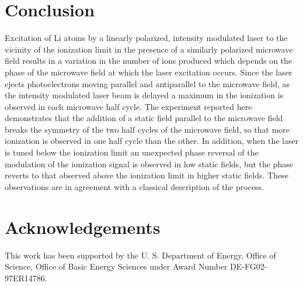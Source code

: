 \documentclass[aps,pra,preprint,groupedaddress]{revtex4-1}
\begin{document}
\section{\label{sec:conc} Conclusion}


Excitation of Li atoms by a linearly polarized, intensity modulated laser to the vicinity of the ionization limit in the presence of a similarly polarized microwave field results in a variation in the number of ions produced which depends on the phase of the microwave field at which the laser excitation occurs. Since the laser ejects photoelectrons moving parallel and antiparallel to the microwave field, as the intensity modulated laser beam is delayed a maximum in the ionization is observed in each microwave half cycle. The experiment reported here demonstrates that the addition of a static field parallel to the microwave field breaks the symmetry of the two half cycles of the microwave field, so that more ionization is observed in one half cycle than the other. In addition, when the laser is tuned below the ionization limit an unexpected phase reversal of the modulation of the ionization signal is observed in low static fields, but the phase reverts to that observed above the ionization limit in higher static fields. These observations are in agreement with a classical description of the process.


\section{\label{sec:ack} Acknowledgements}


This work has been supported by the U. S. Department of Energy, Office of Science, Office of Basic Energy Sciences under Award Number DE-FG02-97ER14786.


\end{document}
